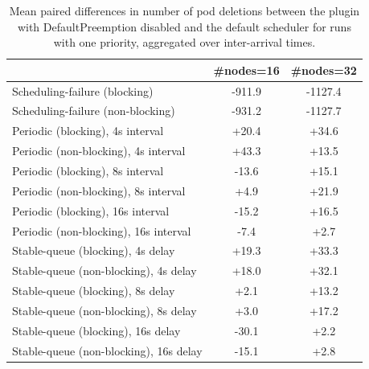 \begin{table}[t]
\tiny
\setlength{\tabcolsep}{1.2pt}
\renewcommand{\arraystretch}{1.12}
\centering
\caption{Mean paired differences in number of pod deletions between the plugin with DefaultPreemption disabled and the default scheduler for runs with one priority, aggregated over inter-arrival times.}
\label{tab:deletions-defpreempt0-prio1-std0-agg-arrival}
\begin{tabular}{l c c}
\toprule
 & \#nodes=16 & \#nodes=32 \\
\midrule
Scheduling-failure (blocking) & -911.9 & -1127.4 \\
Scheduling-failure (non-blocking) & -931.2 & -1127.7 \\
Periodic (blocking), 4s interval & +20.4 & +34.6 \\
Periodic (non-blocking), 4s interval & +43.3 & +13.5 \\
Periodic (blocking), 8s interval & -13.6 & +15.1 \\
Periodic (non-blocking), 8s interval & +4.9 & +21.9 \\
Periodic (blocking), 16s interval & -15.2 & +16.5 \\
Periodic (non-blocking), 16s interval & -7.4 & +2.7 \\
Stable-queue (blocking), 4s delay & +19.3 & +33.3 \\
Stable-queue (non-blocking), 4s delay & +18.0 & +32.1 \\
Stable-queue (blocking), 8s delay & +2.1 & +13.2 \\
Stable-queue (non-blocking), 8s delay & +3.0 & +17.2 \\
Stable-queue (blocking), 16s delay & -30.1 & +2.2 \\
Stable-queue (non-blocking), 16s delay & -15.1 & +2.8 \\
\bottomrule
\end{tabular}
\end{table}
